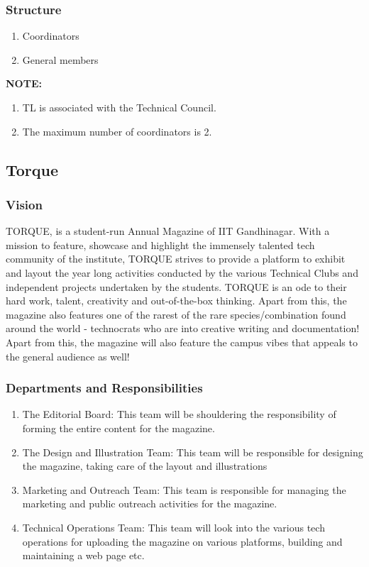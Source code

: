 \documentclass[12pt]{article}
\begin{document}
\subsubsection{Structure}
\begin{enumerate}
    \item Coordinators
    \item General members
\end{enumerate}

\noindent \textbf{NOTE:} \begin{enumerate}
    \item TL is associated with the Technical Council.
    \item The maximum number of coordinators is 2.
\end{enumerate}


\subsection{Torque} \label{Torque}
\subsubsection{Vision}
TORQUE, is a student-run Annual Magazine of IIT Gandhinagar. With a mission to feature, showcase and highlight the immensely talented tech community of the institute, TORQUE strives to provide a platform to exhibit and layout the year long activities conducted by the various Technical Clubs and independent projects undertaken by the students. TORQUE is an ode to their hard work, talent, creativity and out-of-the-box thinking. Apart from this, the magazine also features one of the rarest of the rare species/combination found around the world - technocrats who are into creative writing and documentation! Apart from this, the magazine will also feature the campus vibes that appeals to the general audience as well!

\subsubsection{Departments and Responsibilities}
\begin{enumerate}
    \item The Editorial Board: This team will be shouldering the responsibility of forming the entire content for the magazine. 
    \item The Design and Illustration Team: This team will be responsible for designing the magazine, taking care of the layout and illustrations 
    \item Marketing and Outreach Team: This team is responsible for managing the marketing and public outreach activities for the magazine. 
    \item Technical Operations Team: This team will look into the various tech operations for uploading the magazine on various platforms, building and maintaining a web page etc.
\end{enumerate}
\end{document}
